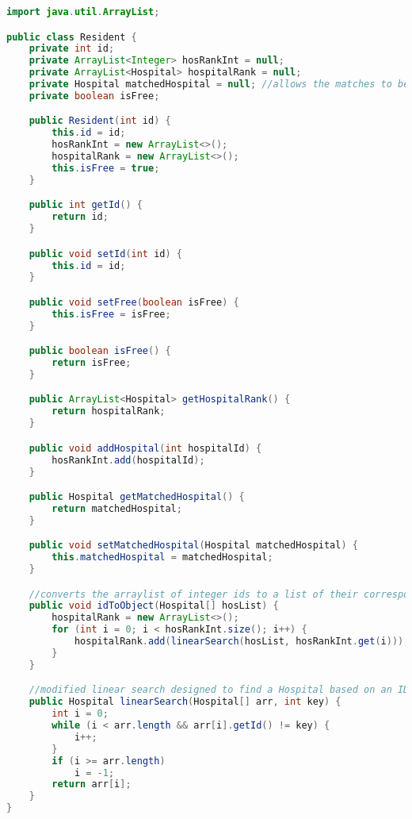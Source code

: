 \documentclass[letterpaper, 10pt,DIV=13]{scrartcl}
\numberwithin{equation}{section} %
\numberwithin{figure}{section} %
\numberwithin{table}{section} %
\begin{document}
\begin{lstlisting}[frame=single, language=java, breaklines]
import java.util.ArrayList;

public class Resident {
    private int id;
    private ArrayList<Integer> hosRankInt = null;
    private ArrayList<Hospital> hospitalRank = null;
    private Hospital matchedHospital = null; //allows the matches to be printed in order based on residents rather than hospital. Only initialized after stability is reached.
    private boolean isFree;

    public Resident(int id) {
        this.id = id;
        hosRankInt = new ArrayList<>();
        hospitalRank = new ArrayList<>();
        this.isFree = true;
    }

    public int getId() {
        return id;
    }

    public void setId(int id) {
        this.id = id;
    }

    public void setFree(boolean isFree) {
        this.isFree = isFree;
    }

    public boolean isFree() {
        return isFree;
    }

    public ArrayList<Hospital> getHospitalRank() {
        return hospitalRank;
    }

    public void addHospital(int hospitalId) {
        hosRankInt.add(hospitalId);
    }

    public Hospital getMatchedHospital() {
        return matchedHospital;
    }

    public void setMatchedHospital(Hospital matchedHospital) {
        this.matchedHospital = matchedHospital;
    }

    //converts the arraylist of integer ids to a list of their corresponding Resident objects, given a list of residen objects. Uses a linear search to do so.
    public void idToObject(Hospital[] hosList) {
        hospitalRank = new ArrayList<>();
        for (int i = 0; i < hosRankInt.size(); i++) {
            hospitalRank.add(linearSearch(hosList, hosRankInt.get(i)));
        }
    }

    //modified linear search designed to find a Hospital based on an ID, and return the object itself
    public Hospital linearSearch(Hospital[] arr, int key) {
        int i = 0;
        while (i < arr.length && arr[i].getId() != key) {
            i++;
        }
        if (i >= arr.length)
            i = -1;
        return arr[i];
    }
}
\end{lstlisting}
\end{document}
